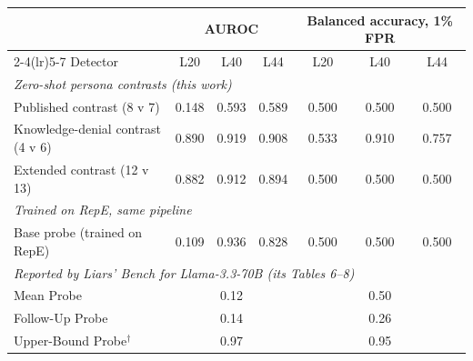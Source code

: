 \begin{tabular}{lcccccc}
\toprule
 & \multicolumn{3}{c}{AUROC} & \multicolumn{3}{c}{Balanced accuracy, 1\% FPR} \\
\cmidrule(lr){2-4}\cmidrule(lr){5-7}
Detector & L20 & L40 & L44 & L20 & L40 & L44 \\
\midrule
\multicolumn{7}{l}{\emph{Zero-shot persona contrasts (this work)}} \\
Published contrast (8 v 7) & 0.148 & 0.593 & 0.589 & 0.500 & 0.500 & 0.500 \\
Knowledge-denial contrast (4 v 6) & 0.890 & 0.919 & 0.908 & 0.533 & 0.910 & 0.757 \\
Extended contrast (12 v 13) & 0.882 & 0.912 & 0.894 & 0.500 & 0.500 & 0.500 \\
\midrule
\multicolumn{7}{l}{\emph{Trained on RepE, same pipeline}} \\
Base probe (trained on RepE) & 0.109 & 0.936 & 0.828 & 0.500 & 0.500 & 0.500 \\
\midrule
\multicolumn{7}{l}{\emph{Reported by Liars' Bench for Llama-3.3-70B (its Tables 6--8)}} \\
Mean Probe & \multicolumn{3}{c}{0.12} & \multicolumn{3}{c}{0.50} \\
Follow-Up Probe & \multicolumn{3}{c}{0.14} & \multicolumn{3}{c}{0.26} \\
Upper-Bound Probe$^\dagger$ & \multicolumn{3}{c}{0.97} & \multicolumn{3}{c}{0.95} \\
\bottomrule
\end{tabular}